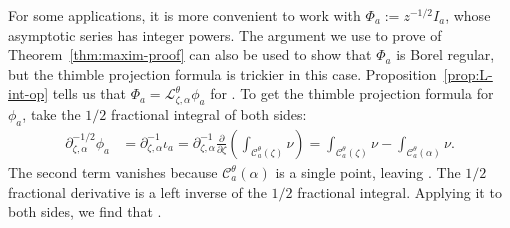 \documentclass[pdftex]{sigma}
\newcommand{\fracderiv}[3]{\partial^{#1}_{#2, #3}}
\newcommand{\laplace}{\mathcal{L}}
\numberwithin{equation}{section}
\begin{document}
\begin{Remark}\label{rmk:1/2-deriv}
For some applications, it is more convenient to work with $\Phi_a := z^{-1/2} I_a$, whose asymptotic series has integer powers. The argument we use to prove of Theorem~\ref{thm:maxim-proof} can also be used to show that $\Phi_a$ is Borel regular, but the thimble projection formula is trickier in this case. Proposition~\ref{prop:L-int-op} tells us that $\Phi_a = \laplace^\theta_{\zeta, \alpha} \phi_a$ for
\smash{$\phi_a := \fracderiv{-1/2}{\zeta}{\alpha} \iota_a$}.
To get the thimble projection formula for $\phi_a$, take the $1/2$ fractional integral of both sides:
\begin{align*}
\fracderiv{-1/2}{\zeta}{\alpha} \phi_a & = \fracderiv{-1}{\zeta}{\alpha} \iota_a = \fracderiv{-1}{\zeta}{\alpha} \frac{\partial}{\partial \zeta} \left( \int_{\mathcal{C}_a^\theta(\zeta)}\nu \right) = \int_{\mathcal{C}_a^\theta(\zeta)}\nu - \int_{\mathcal{C}_a^\theta(\alpha)}\nu.
\end{align*}
The second term vanishes because $\mathcal{C}_a^\theta(\alpha)$ is a single point, leaving
\smash{$ \fracderiv{-1/2}{\zeta}{\alpha} \phi_a = \int_{\mathcal{C}_a^\theta(\zeta)}\nu$}.
The $1/2$ fractional derivative is a left inverse of the $1/2$ fractional integral. Applying it to both sides, we find that
\smash{$%
\phi_a = \fracderiv{1/2}{\zeta}{\alpha} \bigl( \int_{\mathcal{C}_a^\theta(\zeta)}\nu \bigr)$}.
\end{Remark}
\end{document}
